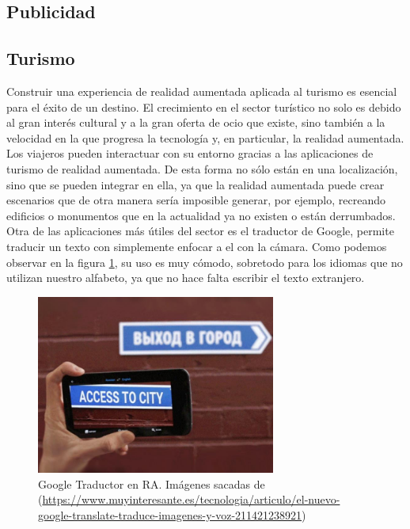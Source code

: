 \subsection{Publicidad}
\subsection{Turismo}
Construir una experiencia de realidad aumentada aplicada al turismo es esencial para el éxito de un destino. El crecimiento en el sector turístico no solo es debido al gran interés cultural y a la gran oferta de ocio que existe, sino también a la velocidad en la que progresa la tecnología y, en particular, la realidad aumentada.\\
Los viajeros pueden interactuar con su entorno gracias a las aplicaciones de turismo de realidad aumentada. De esta forma no sólo están en una localización, sino que se pueden integrar en ella, ya que la realidad aumentada puede crear escenarios que de otra manera sería imposible generar, por ejemplo, recreando edificios o monumentos que en la actualidad ya no existen o están derrumbados.\\
Otra de las aplicaciones más útiles del sector es el traductor de Google, permite traducir un texto con simplemente enfocar a el con la cámara. Como podemos observar en la figura \ref{fig:googletranslate}, su uso es muy cómodo, sobretodo para los idiomas que no utilizan nuestro alfabeto, ya que no hace falta escribir el texto extranjero.

\begin{figure}[H]
     \centering
     \includegraphics[width=0.7\textwidth]{Images/google-translate.jpg}
     \caption{Google Traductor en RA. Imágenes sacadas de (\url{https://www.muyinteresante.es/tecnologia/articulo/el-nuevo-google-translate-traduce-imagenes-y-voz-211421238921})}
     \label{fig:googletranslate}
 \end{figure}



